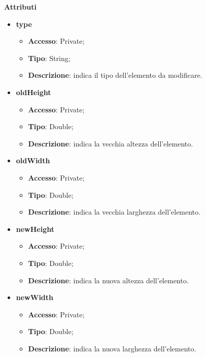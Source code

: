 {{{	\textbf{Attributi}
	\begin{itemize}
		\item \textbf{type}
		\begin{itemize}
			\item \textbf{Accesso}: Private;
			\item \textbf{Tipo}: String;
			\item \textbf{Descrizione}: indica il tipo dell’elemento da modificare.
		\end{itemize}
		\item \textbf{oldHeight}
		\begin{itemize}
			\item \textbf{Accesso}: Private;
			\item \textbf{Tipo}: Double;
			\item \textbf{Descrizione}: indica la vecchia altezza dell’elemento.
		\end{itemize}
		\item \textbf{oldWidth}
		\begin{itemize}
			\item \textbf{Accesso}: Private;
			\item \textbf{Tipo}: Double;
			\item \textbf{Descrizione}: indica la vecchia larghezza dell’elemento.
		\end{itemize}
		\item \textbf{newHeight}
		\begin{itemize}
			\item \textbf{Accesso}: Private;
			\item \textbf{Tipo}: Double;
			\item \textbf{Descrizione}: indica la nuova altezza dell’elemento.
		\end{itemize}
		\item \textbf{newWidth}
		\begin{itemize}
			\item \textbf{Accesso}: Private;
			\item \textbf{Tipo}: Double;
			\item \textbf{Descrizione}: indica la nuova larghezza dell’elemento.
		\end{itemize}
	\end{itemize}
	
}}}
